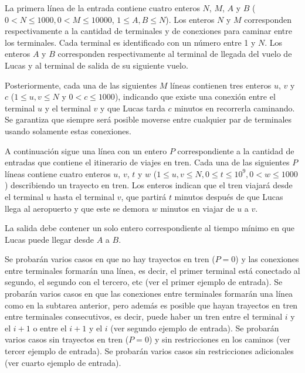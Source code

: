 \documentclass{oci}
\begin{document}
\begin{inputDescription}
  La primera línea de la entrada contiene cuatro enteros $N$, $M$, $A$ y $B$
  ($0 < N\leq 1000, 0 < M \leq 10000$, $1 \leq A, B\leq N$).
  Los enteros $N$ y $M$ corresponden respectivamente a la cantidad de terminales
  y de conexiones para caminar entre los terminales.
  Cada terminal es identificado con un número entre 1 y $N$.
  Los enteros $A$ y $B$ corresponden respectivamente al terminal de llegada del vuelo de Lucas 
  y al terminal de salida de su siguiente vuelo.

  Posteriormente, cada una de las siguientes $M$ líneas contienen tres enteros
  $u$, $v$ y $c$ ($1\leq u, v\leq N$ y $0<c\leq 1000$), indicando que existe una
  conexión entre el terminal $u$ y el terminal $v$ y que Lucas tarda $c$ minutos
  en recorrerla caminando.
  Se garantiza que siempre será posible moverse entre cualquier par de
  terminales usando solamente estas conexiones.

  A continuación sigue una línea con un entero $P$ correspondiente a la
  cantidad de entradas que contiene el itinerario de viajes en tren.
  Cada una de las siguientes $P$ líneas contiene cuatro enteros $u$, $v$,
  $t$ y $w$ ($1 \leq u,v \leq N, 0\leq t\leq 10^9, 0 < w \leq 1000$)
  describiendo un trayecto en tren. 
  Los enteros indican que el tren viajará desde el terminal $u$ hasta el
  terminal $v$, que partirá $t$ minutos después de que Lucas llega al aeropuerto
  y que este se demora $w$ minutos en viajar de $u$ a $v$.
\end{inputDescription}

\begin{outputDescription}
  La salida debe contener un solo entero correspondiente al tiempo mínimo en que
  Lucas puede llegar desde $A$ a $B$.
\end{outputDescription}

\begin{scoreDescription}
   Se probarán varios casos en que no hay trayectos en tren ($P=0$) y
  las conexiones entre terminales formarán una línea, es decir, el primer
  terminal está conectado al segundo, el segundo con el tercero, etc (ver
  el primer ejemplo de entrada). 
   Se probarán varios casos en que las conexiones entre terminales formarán una línea 
  como en la subtarea anterior, pero además es posible que hayan
  trayectos en tren entre terminales consecutivos, es decir, puede haber un
  tren entre el terminal $i$ y el $i+1$ o entre el $i+1$ y el $i$ (ver segundo
  ejemplo de entrada).
   Se probarán varios casos sin trayectos en tren ($P=0$) y sin
  restricciones en los caminos (ver tercer ejemplo de entrada).
   Se probarán varios casos sin restricciones adicionales (ver cuarto
  ejemplo de entrada).
\end{scoreDescription}

\begin{sampleDescription}
\end{sampleDescription}
\end{document}

